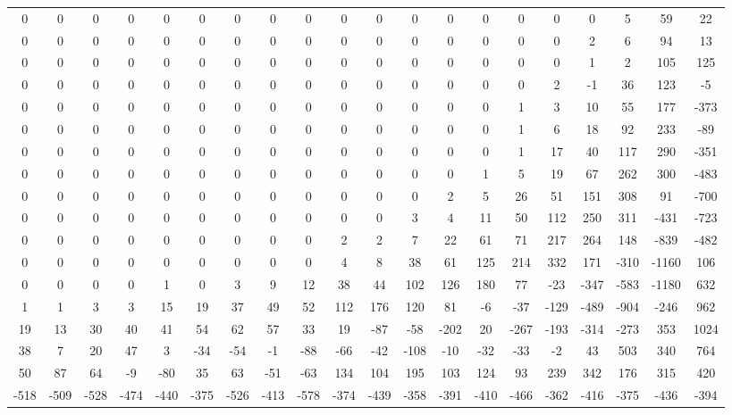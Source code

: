  \begin{tabular}{ | * {20}{c} | } 
0 & 0 & 0 & 0 & 0 & 0 & 0 & 0 & 0 & 0 & 0 & 0 & 0 & 0 & 0 & 0 & 0 & 5 & 59 & 22 \\ 
0 & 0 & 0 & 0 & 0 & 0 & 0 & 0 & 0 & 0 & 0 & 0 & 0 & 0 & 0 & 0 & 2 & 6 & 94 & 13 \\ 
0 & 0 & 0 & 0 & 0 & 0 & 0 & 0 & 0 & 0 & 0 & 0 & 0 & 0 & 0 & 0 & 1 & 2 & 105 & 125 \\ 
0 & 0 & 0 & 0 & 0 & 0 & 0 & 0 & 0 & 0 & 0 & 0 & 0 & 0 & 0 & 2 & -1 & 36 & 123 & -5 \\ 
0 & 0 & 0 & 0 & 0 & 0 & 0 & 0 & 0 & 0 & 0 & 0 & 0 & 0 & 1 & 3 & 10 & 55 & 177 & -373 \\ 
0 & 0 & 0 & 0 & 0 & 0 & 0 & 0 & 0 & 0 & 0 & 0 & 0 & 0 & 1 & 6 & 18 & 92 & 233 & -89 \\ 
0 & 0 & 0 & 0 & 0 & 0 & 0 & 0 & 0 & 0 & 0 & 0 & 0 & 0 & 1 & 17 & 40 & 117 & 290 & -351 \\ 
0 & 0 & 0 & 0 & 0 & 0 & 0 & 0 & 0 & 0 & 0 & 0 & 0 & 1 & 5 & 19 & 67 & 262 & 300 & -483 \\ 
0 & 0 & 0 & 0 & 0 & 0 & 0 & 0 & 0 & 0 & 0 & 0 & 2 & 5 & 26 & 51 & 151 & 308 & 91 & -700 \\ 
0 & 0 & 0 & 0 & 0 & 0 & 0 & 0 & 0 & 0 & 0 & 3 & 4 & 11 & 50 & 112 & 250 & 311 & -431 & -723 \\ 
0 & 0 & 0 & 0 & 0 & 0 & 0 & 0 & 0 & 2 & 2 & 7 & 22 & 61 & 71 & 217 & 264 & 148 & -839 & -482 \\ 
0 & 0 & 0 & 0 & 0 & 0 & 0 & 0 & 0 & 4 & 8 & 38 & 61 & 125 & 214 & 332 & 171 & -310 & -1160 & 106 \\ 
0 & 0 & 0 & 0 & 1 & 0 & 3 & 9 & 12 & 38 & 44 & 102 & 126 & 180 & 77 & -23 & -347 & -583 & -1180 & 632 \\ 
1 & 1 & 3 & 3 & 15 & 19 & 37 & 49 & 52 & 112 & 176 & 120 & 81 & -6 & -37 & -129 & -489 & -904 & -246 & 962 \\ 
19 & 13 & 30 & 40 & 41 & 54 & 62 & 57 & 33 & 19 & -87 & -58 & -202 & 20 & -267 & -193 & -314 & -273 & 353 & 1024 \\ 
38 & 7 & 20 & 47 & 3 & -34 & -54 & -1 & -88 & -66 & -42 & -108 & -10 & -32 & -33 & -2 & 43 & 503 & 340 & 764 \\ 
50 & 87 & 64 & -9 & -80 & 35 & 63 & -51 & -63 & 134 & 104 & 195 & 103 & 124 & 93 & 239 & 342 & 176 & 315 & 420 \\ 
-518 & -509 & -528 & -474 & -440 & -375 & -526 & -413 & -578 & -374 & -439 & -358 & -391 & -410 & -466 & -362 & -416 & -375 & -436 & -394 \\ 
 \end{tabular} 
